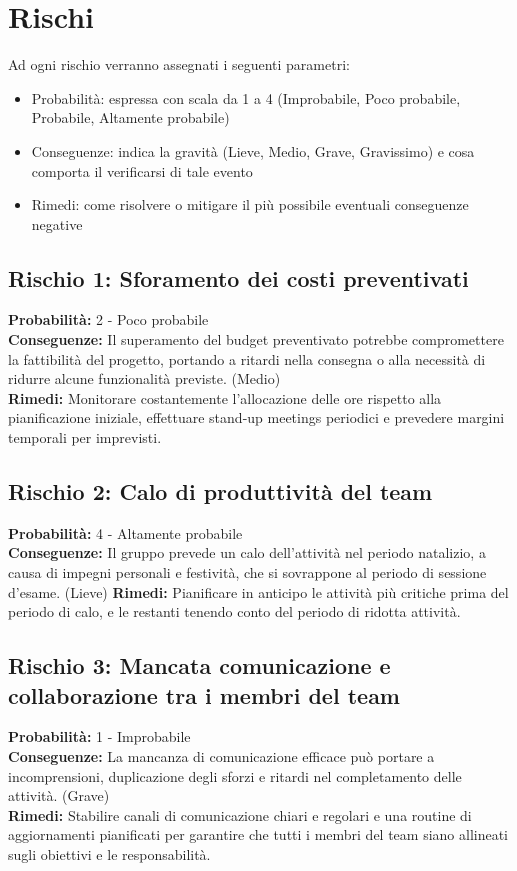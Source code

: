 \documentclass[a4paper,12pt]{article}
\begin{document}
\section{Rischi}
Ad ogni rischio verranno assegnati i seguenti parametri:
\begin{itemize}
    \item Probabilità: espressa con scala da 1 a 4 (Improbabile, Poco probabile, Probabile, Altamente probabile)
    \item Conseguenze: indica la gravità (Lieve, Medio, Grave, Gravissimo) e cosa comporta il verificarsi di tale evento
    \item Rimedi: come risolvere o mitigare il più possibile eventuali conseguenze negative
\end{itemize}

\subsection{Rischio 1: Sforamento dei costi preventivati}
\textbf{Probabilità:} 2 - Poco probabile\\
\textbf{Conseguenze:} Il superamento del budget preventivato potrebbe compromettere la fattibilità del progetto, portando a ritardi nella consegna o alla necessità di ridurre alcune funzionalità previste. (Medio)\\
\textbf{Rimedi:} Monitorare costantemente l'allocazione delle ore rispetto alla pianificazione iniziale, effettuare stand-up meetings periodici e prevedere margini temporali per imprevisti.

\subsection{Rischio 2: Calo di produttività del team}
\textbf{Probabilità:} 4 - Altamente probabile\\
\textbf{Conseguenze:} Il gruppo prevede un calo dell'attività nel periodo natalizio, a causa di impegni personali e festività, che si sovrappone al periodo di sessione d'esame. (Lieve)
\textbf{Rimedi:} Pianificare in anticipo le attività più critiche prima del periodo di calo, e le restanti tenendo conto del periodo di ridotta attività.  

\subsection{Rischio 3: Mancata comunicazione e collaborazione tra i membri del team}
\textbf{Probabilità:} 1 - Improbabile\\
\textbf{Conseguenze:} La mancanza di comunicazione efficace può portare a incomprensioni, duplicazione degli sforzi e ritardi nel completamento delle attività. (Grave)\\
\textbf{Rimedi:} Stabilire canali di comunicazione chiari e regolari e una routine di aggiornamenti pianificati per garantire che tutti i membri del team siano allineati sugli obiettivi e le responsabilità.
\end{document}
